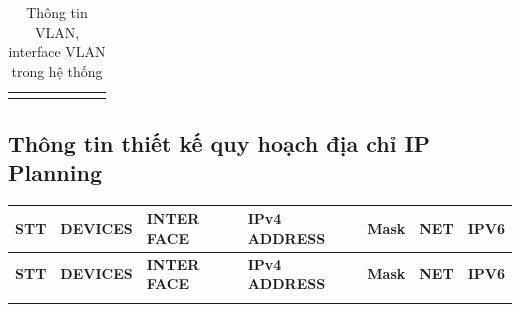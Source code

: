\documentclass[a4paper, 12pt]{article}
\begin{document}
\begin{center}
\begin{longtable}{|p{}|p{}|p{}|p{}|p{}|p{}|p{}|}
 
 \hline
   \caption{Thông tin VLAN, interface VLAN trong hệ thống}
    \label{hinh33}
\end{longtable}
   
\end{center}



\subsection{Thông tin thiết kế quy hoạch địa chỉ IP Planning}
\begin{center}
    \def\arraystretch{2.1}\begin{longtable}{|p{}|p{}|p{}|p{}|p{}|p{}|p{}|}
    
    
    \hline \textbf{STT} &\textbf{DEVICES} & \textbf{INTER FACE} &  \textbf{IPv4 ADDRESS} &  \textbf{Mask} &\textbf{NET} & \textbf{IPV6}\\ \hline 
    
    \endfirsthead
    
    
    
    \hline \textbf{STT} &\textbf{DEVICES} & \textbf{INTER FACE} &  \textbf{IPv4 ADDRESS} &  \textbf{Mask} &\textbf{NET} & \textbf{IPV6}\\ \hline 
    
    \endhead
    
       
    \endfoot
    

\end{longtable}
\end{center}
\end{document}
